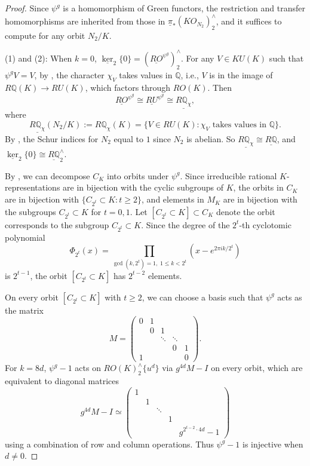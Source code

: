 \documentclass{amsart}
\theoremstyle{plain}
\theoremstyle{definition}
\theoremstyle{remark}
\begin{document}
\begin{proof}
    Since $\psi^g$ is a homomorphism of Green functors, the restriction and transfer homomorphisms are inherited from those in $\underline{\pi}_* (KO_{N_2})_2^\wedge$, and it suffices to compute for any orbit $N_2/K$. 
    
    (1) and (2): When $k=0$, $\underline{\ker}_2\{0\}=(\underline{RO}^{\psi^g})_2^\wedge$. For any $V\in KU(K)$ such that $\psi^g V=V$, by \cite[Proposition 6.7]{bonventre2022ku_g}, the character $\chi_V$ takes values in $\mathbb{Q}$, i.e., $V$ is in the image of $R\mathbb{Q}(K)\to RU(K)$, which factors through $RO(K)$. Then 
    \[ 
    \underline{RO}^{\psi^g}\cong \underline{RU}^{\psi^g}\cong \underline{R\mathbb{Q}_\chi},
    \]
    where 
    $$\underline{R\mathbb{Q}_\chi} (N_2/K):=R\mathbb{Q}_\chi(K)=\{V\in RU(K):\chi_V \text{ takes values in } \mathbb{Q}\}.$$
    By \cite[Proposition 35]{serre1977linear}, the Schur indices for $N_2$ equal to $1$ since $N_2$ is abelian. So $\underline{R\mathbb{Q}_\chi}\cong \underline{R\mathbb{Q}}$, 
    and $\underline{\ker}_2\{0\}\cong \underline{R\mathbb{Q}}_2^\wedge$.

    By , we can decompose $C_K$ into orbits under $\psi^g$.  Since irreducible rational $K$-representations are in bijection with the cyclic subgroups of $K$, the orbits in $C_K$ are in bijection with $\{ C_{2^t}\subset K:t\geq 2\}$, and elements in $M_K$ are  in bijection with the subgroups $C_{2^t}\subset K$ for $t=0,1$. Let $[C_{2^t}\subset K]\subset C_K$ denote the orbit corresponds to the subgroup $C_{2^t}\subset K$. Since the degree of the $2^t$-th cyclotomic polynomial 
    \[
    \Phi_{2^t}(x)=\prod_{\gcd(k,2^t)=1,\;1\leq k<2^t}\left(x-e^{2\pi i k/2^t}\right)
    \]
    is $2^{t-1}$, the orbit $[C_{2^t}\subset K]$ has $2^{t-2}$ elements.

    On every orbit $[C_{2^t}\subset K]$ with $t\geq 2$, we can choose a basis such that $\psi^g$ acts as the matrix
    \[ 
    M=
    \begin{pmatrix}
    0 & 1 &        &        &        \\
        &     0 & 1&        &        \\
        &        & \ddots& \ddots &        \\
        &        &       &      0& 1 \\
    1 &    &       &        & 0
    \end{pmatrix}.
    \]
    For $k=8d$, $\psi^g-1$ acts on $RO(K)_2^\wedge\{u^d\}$ via $g^{4d}M-I$ on every orbit, which are equivalent to diagonal matrices 
    \[
    g^{4d}M-I\simeq
    \begin{pmatrix}
    1 &   &   &   &   \\
        & 1 &   &   &   \\
        &   & \ddots &   &   \\
        &   &   & 1 &   \\
        &   &   &   & g^{2^{t-2}\cdot 4d}-1
    \end{pmatrix}
    \] 
    using a combination of row and column operations. Thus $\psi^g-1$ is injective when $d\neq 0$.


\end{proof}
\end{document}
